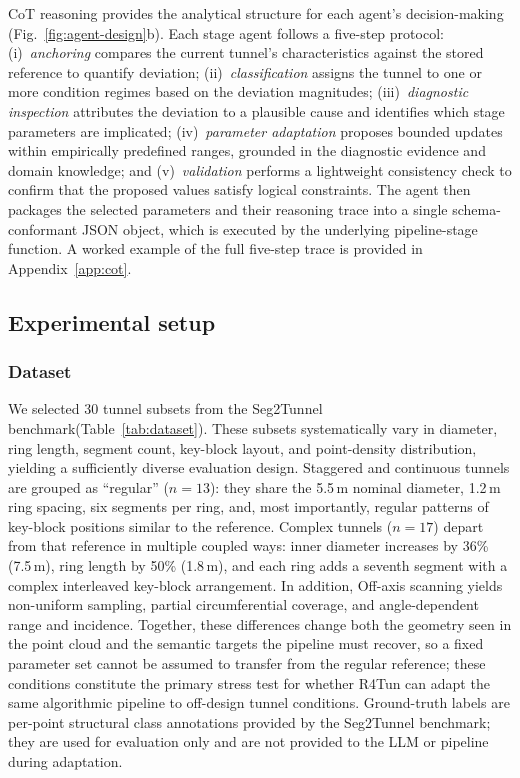 \documentclass[a4paper,fleqn]{cas-dc}
\begin{document}
CoT reasoning provides the analytical structure for each agent's decision-making (Fig.~\ref{fig:agent-design}b). Each stage agent follows a five-step protocol: (i)~\emph{anchoring} compares the current tunnel's characteristics against the stored reference to quantify deviation; (ii)~\emph{classification} assigns the tunnel to one or more condition regimes based on the deviation magnitudes; (iii)~\emph{diagnostic inspection} attributes the deviation to a plausible cause and identifies which stage parameters are implicated; (iv)~\emph{parameter adaptation} proposes bounded updates within empirically predefined ranges, grounded in the diagnostic evidence and domain knowledge; and (v)~\emph{validation} performs a lightweight consistency check to confirm that the proposed values satisfy logical constraints. The agent then packages the selected parameters and their reasoning trace into a single schema-conformant JSON object, which is executed by the underlying pipeline-stage function. A worked example of the full five-step trace is provided in Appendix~\ref{app:cot}.

\subsection{Experimental setup}\label{sec:exp-setup}

\subsubsection{Dataset}\label{sec:dataset}

We selected 30 tunnel subsets from the Seg2Tunnel benchmark(Table~\ref{tab:dataset}). These subsets systematically vary in diameter, ring length, segment count, key-block layout, and point-density distribution, yielding a sufficiently diverse evaluation design. Staggered and continuous tunnels are grouped as ``regular'' ($n = 13$): they share the 5.5\,m nominal diameter, 1.2\,m ring spacing, six segments per ring, and, most importantly, regular patterns of key-block positions similar to the reference. Complex tunnels ($n = 17$) depart from that reference in multiple coupled ways: inner diameter increases by 36\% (7.5\,m), ring length by 50\% (1.8\,m), and each ring adds a seventh segment with a complex interleaved key-block arrangement. In addition, Off-axis scanning yields non-uniform sampling, partial circumferential coverage, and angle-dependent range and incidence. Together, these differences change both the geometry seen in the point cloud and the semantic targets the pipeline must recover, so a fixed parameter set cannot be assumed to transfer from the regular reference; these conditions constitute the primary stress test for whether R4Tun can adapt the same algorithmic pipeline to off-design tunnel conditions. Ground-truth labels are per-point structural class annotations provided by the Seg2Tunnel benchmark; they are used for evaluation only and are not provided to the LLM or pipeline during adaptation.
\end{document}
